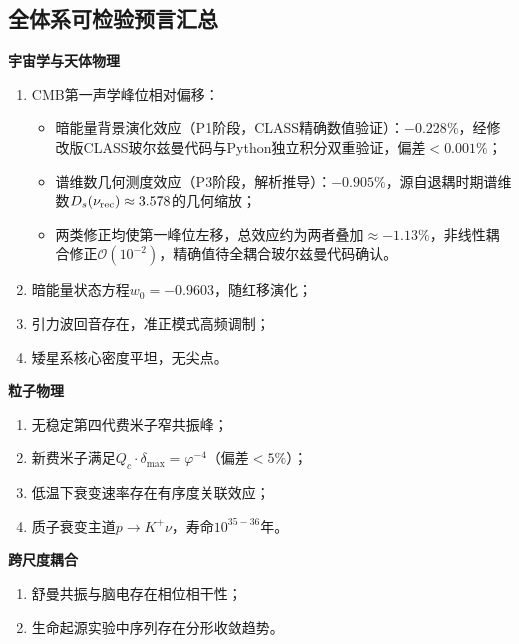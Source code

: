 \documentclass[12pt,a4paper,twocolumn]{article}
\renewcommand{\phi}{\varphi}
\begin{document}
\subsection{全体系可检验预言汇总}
\textbf{宇宙学与天体物理}
\begin{enumerate}
\item CMB第一声学峰位相对偏移：
  \begin{itemize}
  \item 暗能量背景演化效应（P1阶段，CLASS精确数值验证）：$\mathbf{-0.228\%}$，经修改版CLASS玻尔兹曼代码与Python独立积分双重验证，偏差$<0.001\%$；
  \item 谱维数几何测度效应（P3阶段，解析推导）：$\mathbf{-0.905\%}$，源自退耦时期谱维数$D_s(\nu_{\rm rec})\approx3.578$的几何缩放；
  \item 两类修正均使第一峰位左移，总效应约为两者叠加$\mathbf{\approx -1.13\%}$，非线性耦合修正$\mathcal{O}(10^{-2})$，精确值待全耦合玻尔兹曼代码确认。
  \end{itemize}
\item 暗能量状态方程$w_0 = -0.9603$，随红移演化；
\item 引力波回音存在，准正模式高频调制；
\item 矮星系核心密度平坦，无尖点。
\end{enumerate}

\textbf{粒子物理}
\begin{enumerate}
\item 无稳定第四代费米子窄共振峰；
\item 新费米子满足$Q_c \cdot \delta_{\max} = \phi^{-4}$（偏差$<5\%$）；
\item 低温下衰变速率存在有序度关联效应；
\item 质子衰变主道$p \to K^+ \nu$，寿命$10^{35-36}$年。
\end{enumerate}

\textbf{跨尺度耦合}
\begin{enumerate}
\item 舒曼共振与脑电存在相位相干性；
\item 生命起源实验中序列存在分形收敛趋势。
\end{enumerate}
\end{document}
